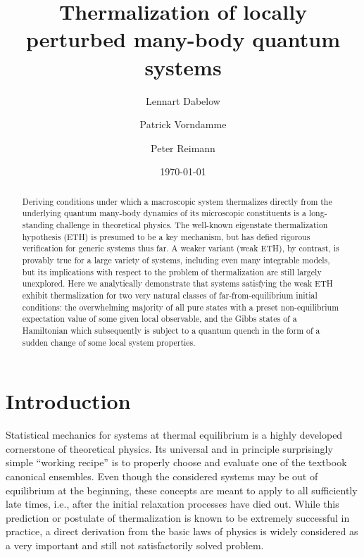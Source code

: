 \documentclass[twocolumn,aps,prb,floatfix,superscriptaddress]{revtex4-2}
\newcommand{\<}{\left\langle}	%
\renewcommand{\>}{\right\rangle}	%
\begin{document}
\title{Thermalization of locally perturbed many-body quantum systems}
\author{Lennart Dabelow}
\author{Patrick Vorndamme}
\author{Peter Reimann}
\date{\today}

\begin{abstract}
Deriving 
conditions under which a macroscopic
system thermalizes directly 
from the underlying %
quantum many-body dynamics of its microscopic constituents is a long-standing 
challenge in theoretical physics.
The 
well-known
eigenstate thermalization hypothesis (ETH) is presumed to be a key mechanism,
but has defied rigorous verification for 
generic
systems thus far.
A weaker variant (weak ETH), by contrast, is provably true for a 
large variety of systems,
including even many integrable models,
but 
its implications 
with respect to the problem of
thermalization are still largely unexplored.
Here we analytically demonstrate that systems satisfying the weak ETH 
exhibit thermalization for two very natural classes of far-from-equilibrium 
initial conditions:
the overwhelming majority of all pure states with a preset non-equilibrium 
expectation value of some given
local 
observable, and the Gibbs states of a Hamiltonian which subsequently 
is subject to a quantum quench in the form of a 
sudden
change of some local system properties.
\end{abstract}

\maketitle


\section{Introduction}

Statistical mechanics for systems at thermal equilibrium 
is a highly developed cornerstone of theoretical physics. 
Its universal and in principle surprisingly simple 
``working recipe'' is to properly choose and evaluate 
one of the textbook canonical ensembles. 
Even though the considered systems may
be out of equilibrium at the beginning,
these concepts are 
meant to apply to all sufficiently late times, i.e., after 
the initial relaxation processes have died out.
While this prediction or postulate of thermalization
is known to be extremely successful in practice, 
a direct derivation from the basic laws of physics 
is widely considered as a very important and still 
not satisfactorily solved problem.
\end{document}

